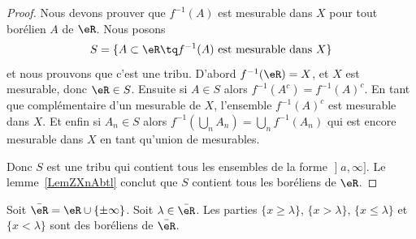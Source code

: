 \begin{proof}
	Nous devons prouver que \( f^{-1}(A)\) est mesurable dans \( X\) pour tout borélien \( A\) de \( \eR\). Nous posons
	\begin{equation}
		S=\{ A\subset \eR\tq f^{-1}(A)\text{ est mesurable dans } X \}
	\end{equation}
	et nous prouvons que c'est une tribu. D'abord \( f^{-1}(\eR)=X\), et \( X\) est mesurable, donc \( \eR\in S\). Ensuite si \( A\in S\) alors \( f^{-1}(A^c)=f^{-1}(A)^c\). En tant que complémentaire d'un mesurable de \( X\), l'ensemble \( f^{-1}(A)^c\) est mesurable dans \( X\). Et enfin si \( A_n\in S \) alors \( f^{-1}(\bigcup_nA_n)=\bigcup_nf^{-1}(A_n)\) qui est encore mesurable dans \( X\) en tant qu'union de mesurables.

	Donc \( S\) est une tribu qui contient tous les ensembles de la forme \( \mathopen] a , \infty \mathclose]\). Le lemme~\ref{LemZXnAbtl} conclut que \( S\) contient tous les boréliens de \( \eR\).
\end{proof}

\begin{lemma}       \label{LEMooMYUFooKqdDNc}
	Soit \( \bar \eR=\eR\cup\{ \pm\infty \}\). Soit \( \lambda\in\bar \eR\).  Les parties \( \{ x\geq\lambda \}\), \( \{ x>\lambda \}\), \( \{ x\leq \lambda \}\) et \( \{ x<\lambda \}\) sont des boréliens de \( \bar\eR\).
\end{lemma}


